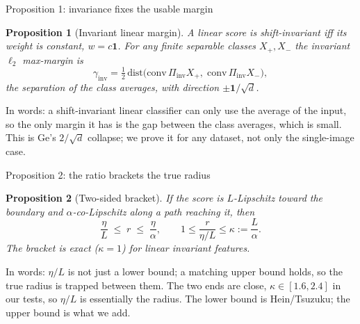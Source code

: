 \documentclass[aspectratio=169,10pt]{beamer}
\newtheorem{proposition}{Proposition}
\newcommand{\etaL}{\ensuremath{\eta/L}}
\begin{document}
\begin{frame}{Proposition 1: invariance fixes the usable margin}{}
  \vspace{0.2em}
  \begin{proposition}[Invariant linear margin]
    \small A linear score is shift-invariant iff its weight is constant, $w=c\mathbf 1$. For any finite
    separable classes $X_+,X_-$ the invariant $\ell_2$ max-margin is
    \[ \gamma_{\mathrm{inv}}=\tfrac12\,\mathrm{dist}\!\big(\mathrm{conv}\,\Pi_{\mathrm{inv}}X_+,\;
       \mathrm{conv}\,\Pi_{\mathrm{inv}}X_-\big), \]
    the separation of the class averages, with direction $\pm\mathbf 1/\sqrt d$.
  \end{proposition}
  \vspace{0.3em}
  {\footnotesize\color{slate} In words: a shift-invariant linear classifier can only use the average of
  the input, so the only margin it has is the gap between the class averages, which is small. This is Ge's
  $2/\sqrt d$ collapse; we prove it for any dataset, not only the single-image case.}
\end{frame}

\begin{frame}{Proposition 2: the ratio brackets the true radius}{}
  \vspace{0.2em}
  \begin{proposition}[Two-sided bracket]
    \small If the score is $L$-Lipschitz toward the boundary and $\alpha$-co-Lipschitz along a path
    reaching it, then
    \[ \frac{\eta}{L}\;\le\; r \;\le\; \frac{\eta}{\alpha}, \qquad
       1\le\frac{r}{\eta/L}\le\kappa:=\frac{L}{\alpha}. \]
    The bracket is exact ($\kappa=1$) for linear invariant features.
  \end{proposition}
  \vspace{0.3em}
  {\footnotesize\color{slate} In words: $\etaL$ is not just a lower bound; a matching upper bound holds,
  so the true radius is trapped between them. The two ends are close, $\kappa\in[1.6,2.4]$ in our tests,
  so $\etaL$ is essentially the radius. The lower bound is Hein/Tsuzuku; the upper bound is what we add.}
\end{frame}
\end{document}
